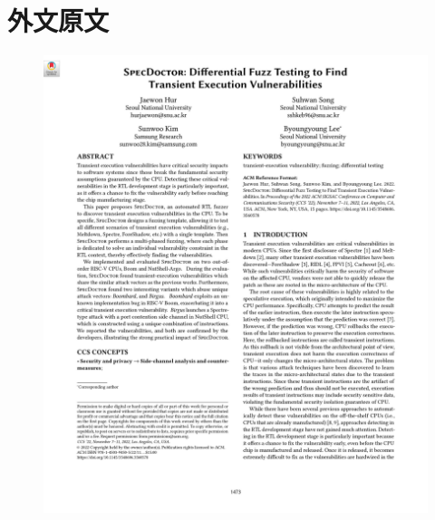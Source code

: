 \cleardoublepage
\chapter{外文原文}

\begin{figure}[!h]
    \centering
    \includegraphics[width=\linewidth]{figure/proposal/SpecDoctor-页面-1.jpg}
    \label{review:generation-frame}
\end{figure}

\begin{center}
    
\end{center}
